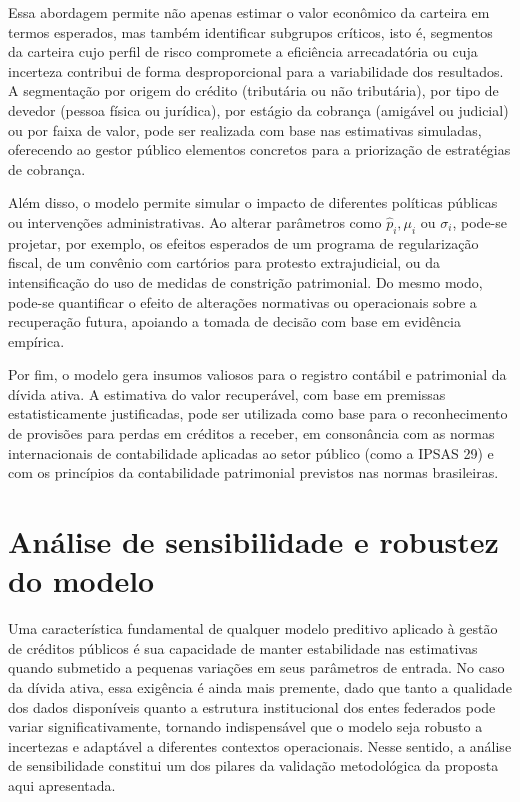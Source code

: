 \documentclass[a4paper,12pt]{article}
\begin{document}
Essa abordagem permite não apenas estimar o valor econômico da carteira em termos esperados, mas também identificar subgrupos críticos, isto é, segmentos da carteira cujo perfil de risco compromete a eficiência arrecadatória ou cuja incerteza contribui de forma desproporcional para a variabilidade dos resultados. A segmentação por origem do crédito (tributária ou não tributária), por tipo de devedor (pessoa física ou jurídica), por estágio da cobrança (amigável ou judicial) ou por faixa de valor, pode ser realizada com base nas estimativas simuladas, oferecendo ao gestor público elementos concretos para a priorização de estratégias de cobrança.

Além disso, o modelo permite simular o impacto de diferentes políticas públicas ou intervenções administrativas. Ao alterar parâmetros como 
$\hat{p}_{i}, \mu_{i}$ ou $\sigma_{i}$, pode-se projetar, por exemplo, os efeitos esperados de um programa de regularização fiscal, de um convênio com cartórios para protesto extrajudicial, ou da intensificação do uso de medidas de constrição patrimonial. Do mesmo modo, pode-se quantificar o efeito de alterações normativas ou operacionais sobre a recuperação futura, apoiando a tomada de decisão com base em evidência empírica.

Por fim, o modelo gera insumos valiosos para o registro contábil e patrimonial da dívida ativa. A estimativa do valor recuperável, com base em premissas estatisticamente justificadas, pode ser utilizada como base para o reconhecimento de provisões para perdas em créditos a receber, em consonância com as normas internacionais de contabilidade aplicadas ao setor público (como a IPSAS 29) e com os princípios da contabilidade patrimonial previstos nas normas brasileiras.

\section{Análise de sensibilidade e robustez do modelo}
Uma característica fundamental de qualquer modelo preditivo aplicado à gestão de créditos públicos é sua capacidade de manter estabilidade nas estimativas quando submetido a pequenas variações em seus parâmetros de entrada. No caso da dívida ativa, essa exigência é ainda mais premente, dado que tanto a qualidade dos dados disponíveis quanto a estrutura institucional dos entes federados pode variar significativamente, tornando indispensável que o modelo seja robusto a incertezas e adaptável a diferentes contextos operacionais. Nesse sentido, a análise de sensibilidade constitui um dos pilares da validação metodológica da proposta aqui apresentada.
\end{document}
